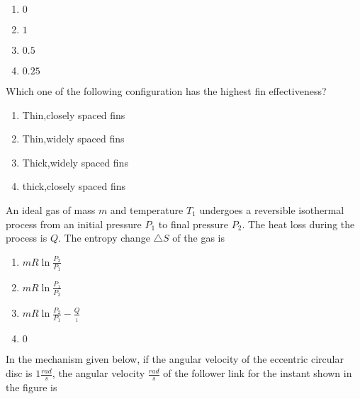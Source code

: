     \begin{enumerate}
        \item $0$
        \item $1$
        \item $0.5$
        \item $0.25$
    \end{enumerate}
    \item Which one of the following configuration has the highest fin effectiveness?
    \begin{enumerate}
        \item Thin,closely spaced fins
        \item Thin,widely spaced fins
        \item Thick,widely spaced fins
        \item thick,closely spaced fins
    \end{enumerate}
    \item An ideal gas of mass $m$ and temperature $T_1$ undergoes a reversible isothermal process from an initial pressure $P_1$ to final pressure $P_2$. The heat loss during the process is $Q$. The entropy change $\triangle S$ of the gas is
    \begin{enumerate}
        \item $mR\ln\frac{P_2}{P_1}$
        \item $mR\ln\frac{P_1}{P_2}$
        \item $mR\ln\frac{P_2}{P_1}-\frac{Q}{_1}$
        \item $0$
    \end{enumerate}
    \item In the mechanism given below, if the angular velocity of the eccentric circular disc is $1\frac{rad}{s}$, the angular velocity $\frac{rad}{s}$ of the follower link for the instant shown in the figure is
